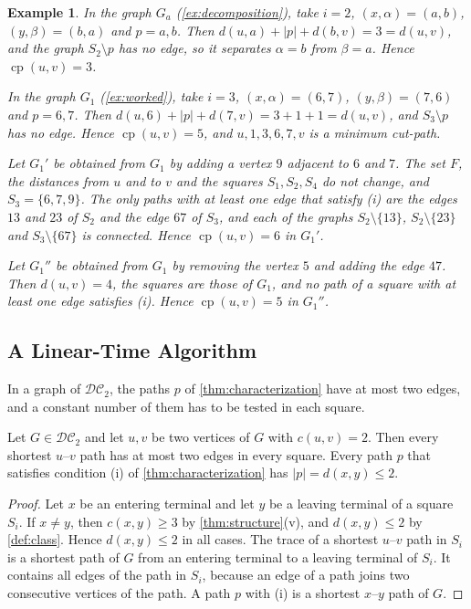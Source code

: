 \documentclass[pdflatex,sn-mathphys-num]{sn-jnl}%
\theoremstyle{thmstyleone}%
\theoremstyle{thmstyletwo}%
\newtheorem{example}{Example}%
\theoremstyle{thmstylethree}%
\newcommand{\cp}{\operatorname{cp}}%
\newcommand{\DC}{\mathcal{DC}_2}%
\begin{document}
\begin{example}
\label{ex:criterion}
In the graph $G_a$ (\cref{ex:decomposition}), take $i = 2$, $(x, \alpha) = (a, b)$, $(y, \beta) = (b, a)$ and $p = a, b$.
Then $d(u, a) + |p| + d(b, v) = 3 = d(u, v)$, and the graph $S_2 \setminus p$ has no edge, so it separates $\alpha = b$ from $\beta = a$.
Hence $\cp(u, v) = 3$.

In the graph $G_1$ (\cref{ex:worked}), take $i = 3$, $(x, \alpha) = (6, 7)$, $(y, \beta) = (7, 6)$ and $p = 6, 7$.
Then $d(u, 6) + |p| + d(7, v) = 3 + 1 + 1 = d(u, v)$, and $S_3 \setminus p$ has no edge.
Hence $\cp(u, v) = 5$, and $u, 1, 3, 6, 7, v$ is a minimum cut-path.

Let $G_1'$ be obtained from $G_1$ by adding a vertex $9$ adjacent to $6$ and $7$.
The set $F$, the distances from $u$ and to $v$ and the squares $S_1, S_2, S_4$ do not change, and $S_3 = \{6, 7, 9\}$.
The only paths with at least one edge that satisfy (i) are the edges $13$ and $23$ of $S_2$ and the edge $67$ of $S_3$, and each of the graphs $S_2 \setminus \{13\}$, $S_2 \setminus \{23\}$ and $S_3 \setminus \{67\}$ is connected.
Hence $\cp(u, v) = 6$ in $G_1'$.

Let $G_1''$ be obtained from $G_1$ by removing the vertex $5$ and adding the edge $47$.
Then $d(u, v) = 4$, the squares are those of $G_1$, and no path of a square with at least one edge satisfies (i).
Hence $\cp(u, v) = 5$ in $G_1''$.
\end{example}

\subsection{A Linear-Time Algorithm}
\label{sec:algorithm}

In a graph of $\DC$, the paths $p$ of \cref{thm:characterization} have at most two edges, and a constant number of them has to be tested in each square.

\begin{corollary}
\label{cor:two-edges}
Let $G \in \DC$ and let $u, v$ be two vertices of $G$ with $c(u, v) = 2$.
Then every shortest $u$--$v$ path has at most two edges in every square.
Every path $p$ that satisfies condition (i) of \cref{thm:characterization} has $|p| = d(x, y) \leq 2$.
\end{corollary}

\begin{proof}
Let $x$ be an entering terminal and let $y$ be a leaving terminal of a square $S_i$.
If $x \neq y$, then $c(x, y) \geq 3$ by \cref{thm:structure}(v), and $d(x, y) \leq 2$ by \cref{def:class}.
Hence $d(x, y) \leq 2$ in all cases.
The trace of a shortest $u$--$v$ path in $S_i$ is a shortest path of $G$ from an entering terminal to a leaving terminal of $S_i$.
It contains all edges of the path in $S_i$, because an edge of a path joins two consecutive vertices of the path.
A path $p$ with (i) is a shortest $x$--$y$ path of $G$.
\end{proof}
\end{document}
